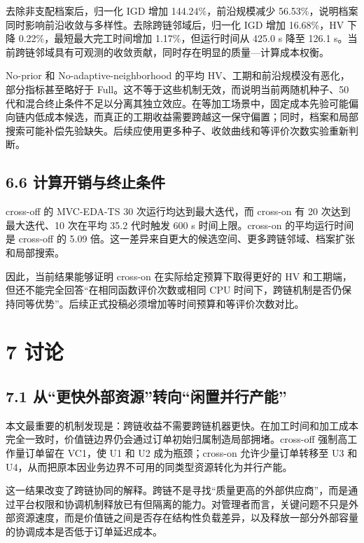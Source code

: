 \documentclass[UTF8,11pt]{ctexart}
\begin{document}
去除非支配档案后，归一化 IGD 增加 144.24\%，前沿规模减少 56.53\%，说明档案同时影响前沿收敛与多样性。去除跨链邻域后，归一化 IGD 增加 16.68\%，HV 下降 0.22\%，最短最大完工时间增加 1.17\%，但运行时间从 425.0 s 降至 126.1 s。当前跨链邻域具有可观测的收敛贡献，同时存在明显的质量—计算成本权衡。

No-prior 和 No-adaptive-neighborhood 的平均 HV、工期和前沿规模没有恶化，部分指标甚至略好于 Full。这不等于这些机制无效，而说明当前两随机种子、50 代和混合终止条件不足以分离其独立效应。在等加工场景中，固定成本先验可能偏向链内低成本候选，而真正的工期收益需要跨越这一保守偏置；同时，档案和局部搜索可能补偿先验缺失。后续应使用更多种子、收敛曲线和等评价次数实验重新判断。

\subsection*{6.6 计算开销与终止条件}

cross-off 的 MVC-EDA-TS 30 次运行均达到最大迭代，而 cross-on 有 20 次达到最大迭代、10 次在平均 35.2 代时触发 600 s 时间上限。cross-on 的平均运行时间是 cross-off 的 5.09 倍。这一差异来自更大的候选空间、更多跨链邻域、档案扩张和局部搜索。

因此，当前结果能够证明 cross-on 在实际给定预算下取得更好的 HV 和工期端，但还不能完全回答“在相同函数评价次数或相同 CPU 时间下，跨链机制是否仍保持同等优势”。后续正式投稿必须增加等时间预算和等评价次数对比。

\section*{7 讨论}

\subsection*{7.1 从“更快外部资源”转向“闲置并行产能”}

本文最重要的机制发现是：跨链收益不需要跨链机器更快。在加工时间和加工成本完全一致时，价值链边界仍会通过订单初始归属制造局部拥堵。cross-off 强制高工作量订单留在 VC1，使 U1 和 U2 成为瓶颈；cross-on 允许少量订单转移至 U3 和 U4，从而把原本因业务边界不可用的同类型资源转化为并行产能。

这一结果改变了跨链协同的解释。跨链不是寻找“质量更高的外部供应商”，而是通过平台权限和协调机制释放已有但隔离的能力。对管理者而言，关键问题不只是外部资源速度，而是价值链之间是否存在结构性负载差异，以及释放一部分外部容量的协调成本是否低于订单延迟成本。
\end{document}
